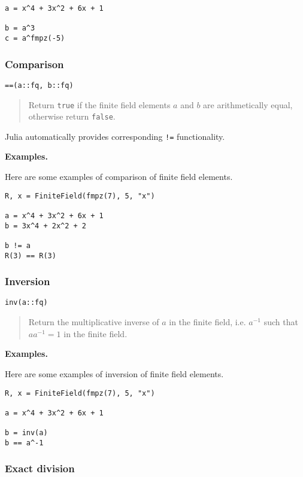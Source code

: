 \documentclass[a4paper,10pt]{article}
\newcommand{\code}{\lstinline}
\newcommand{\desc}[1]{\vspace{-3mm}\begin{quote}#1\end{quote}}
\begin{document}
{{\begin{lstlisting}
a = x^4 + 3x^2 + 6x + 1

b = a^3
c = a^fmpz(-5)
\end{lstlisting}

\subsubsection{Comparison}

\begin{lstlisting}
==(a::fq, b::fq)
\end{lstlisting}

\desc{Return \code{true} if the finite field elements $a$ and $b$ are 
arithmetically equal, otherwise return \code{false}.}

Julia automatically provides corresponding \code{!=} functionality.

\textbf{Examples.}

Here are some examples of comparison of finite field elements.

\begin{lstlisting}
R, x = FiniteField(fmpz(7), 5, "x")

a = x^4 + 3x^2 + 6x + 1
b = 3x^4 + 2x^2 + 2

b != a
R(3) == R(3)
\end{lstlisting}

\subsubsection{Inversion}

\begin{lstlisting}
inv(a::fq)
\end{lstlisting}

\desc{Return the multiplicative inverse of $a$ in the finite field, i.e. 
$a^{-1}$ such that $aa^{-1} = 1$ in the finite field.}

\textbf{Examples.}

Here are some examples of inversion of finite field elements.

\begin{lstlisting}
R, x = FiniteField(fmpz(7), 5, "x")

a = x^4 + 3x^2 + 6x + 1

b = inv(a)
b == a^-1
\end{lstlisting}

\subsubsection{Exact division}

}}
\end{document}
